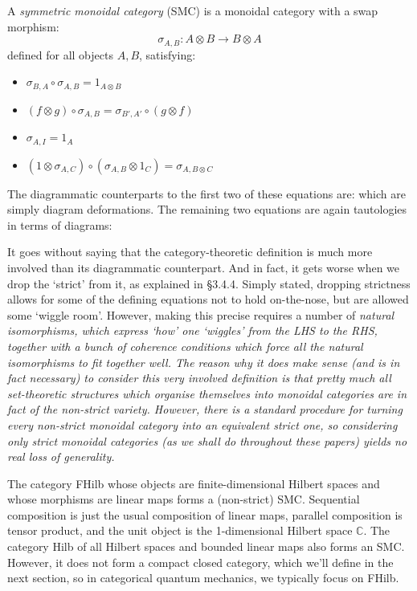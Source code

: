 \documentclass[10pt]{article}
\begin{document}
\begin{definition}
  A \textit{symmetric monoidal category} (SMC) is a monoidal category with a swap morphism:
  \[
  \sigma_{A,B} : A\otimes B \to B \otimes A
  \]
  defined for all objects $A, B$, satisfying:  
  \begin{itemize}
    \item $\sigma_{B,A} \circ \sigma_{A,B} = 1_{A\otimes B}$ 
    \item $(f \otimes g) \circ \sigma_{A,B} = \sigma_{B',A'} \circ (g \otimes f)$
    \item $\sigma_{A,I} = 1_A$
    \item $(1 \otimes \sigma_{A,C}) \circ (\sigma_{A,B} \otimes 1_C) = \sigma_{A,B\otimes C}$ 
  \end{itemize}
\end{definition} 

The diagrammatic counterparts to the first two of these equations are:
which are simply diagram deformations. The remaining two equations are again tautologies in terms of diagrams:
  
It goes without saying that the category-theoretic definition is much more involved than its diagrammatic counterpart.  And in fact, it gets worse when we drop the `strict' from it, as explained in \cite{CatsII} \S  3.4.4. Simply stated, dropping strictness allows for some of the defining equations not to hold on-the-nose,  but are allowed some `wiggle room'. However, making this precise requires a number of \em natural isomorphisms\em, which express `how' one  `wiggles' from the LHS to the RHS, together with a bunch of \em coherence conditions \em which force all the natural isomorphisms to fit together well. The reason why it does make sense (and is in fact necessary) to consider this very involved definition is that  pretty much all set-theoretic structures which organise themselves into monoidal categories are in fact of the non-strict variety.  However, there is a standard procedure for turning every non-strict monoidal category into an equivalent strict one, so considering only strict monoidal categories (as we shall do throughout these papers) yields no real loss of generality.

\begin{example}
The category FHilb whose objects are finite-dimensional Hilbert spaces and whose morphisms are linear maps forms a (non-strict) SMC. Sequential composition is just the usual composition of linear maps, parallel composition is tensor product, and the unit object is the 1-dimensional Hilbert space $\mathbb C$.   The category Hilb of all Hilbert spaces and bounded linear maps also forms an SMC. However,  it does not form a compact closed category, which we'll define in the next section, so in categorical quantum mechanics, we typically focus on FHilb.
\end{example}
\end{document}
